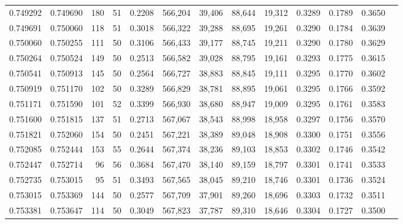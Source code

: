 \begin{tabular}{rrrrrrrrrrrrr}
0.749292 & 0.749690 &   180 &  51 &                                     0.2208 & 566,204 &  39,406 &  88,644 &  19,312 & 0.3289 & 0.1789 & 0.3650 \\
0.749691 & 0.750060 &   118 &  51 &                                     0.3018 & 566,322 &  39,288 &  88,695 &  19,261 & 0.3290 & 0.1784 & 0.3639 \\
0.750060 & 0.750255 &   111 &  50 &                                     0.3106 & 566,433 &  39,177 &  88,745 &  19,211 & 0.3290 & 0.1780 & 0.3629 \\
0.750264 & 0.750524 &   149 &  50 &                                     0.2513 & 566,582 &  39,028 &  88,795 &  19,161 & 0.3293 & 0.1775 & 0.3615 \\
0.750541 & 0.750913 &   145 &  50 &                                     0.2564 & 566,727 &  38,883 &  88,845 &  19,111 & 0.3295 & 0.1770 & 0.3602 \\
0.750919 & 0.751170 &   102 &  50 &                                     0.3289 & 566,829 &  38,781 &  88,895 &  19,061 & 0.3295 & 0.1766 & 0.3592 \\
0.751171 & 0.751590 &   101 &  52 &                                     0.3399 & 566,930 &  38,680 &  88,947 &  19,009 & 0.3295 & 0.1761 & 0.3583 \\
0.751600 & 0.751815 &   137 &  51 &                                     0.2713 & 567,067 &  38,543 &  88,998 &  18,958 & 0.3297 & 0.1756 & 0.3570 \\
0.751821 & 0.752060 &   154 &  50 &                                     0.2451 & 567,221 &  38,389 &  89,048 &  18,908 & 0.3300 & 0.1751 & 0.3556 \\
0.752085 & 0.752444 &   153 &  55 &                                     0.2644 & 567,374 &  38,236 &  89,103 &  18,853 & 0.3302 & 0.1746 & 0.3542 \\
0.752447 & 0.752714 &    96 &  56 &                                     0.3684 & 567,470 &  38,140 &  89,159 &  18,797 & 0.3301 & 0.1741 & 0.3533 \\
0.752735 & 0.753015 &    95 &  51 &                                     0.3493 & 567,565 &  38,045 &  89,210 &  18,746 & 0.3301 & 0.1736 & 0.3524 \\
0.753015 & 0.753369 &   144 &  50 &                                     0.2577 & 567,709 &  37,901 &  89,260 &  18,696 & 0.3303 & 0.1732 & 0.3511 \\
0.753381 & 0.753647 &   114 &  50 &                                     0.3049 & 567,823 &  37,787 &  89,310 &  18,646 & 0.3304 & 0.1727 & 0.3500 \\

\end{tabular}
